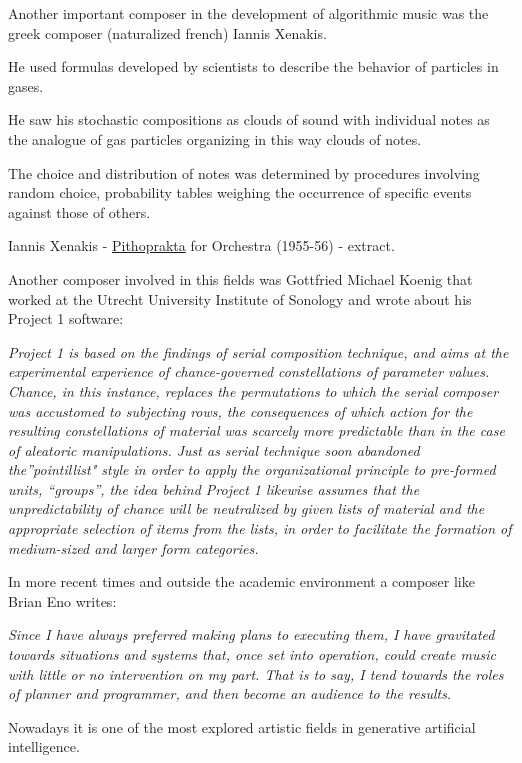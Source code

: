 Another important composer in the development of algorithmic music was the greek composer (naturalized french) Iannis Xenakis.

He used formulas developed by scientists to describe the behavior of particles in gases.

He saw his stochastic compositions as clouds of sound with individual notes as the analogue of gas particles organizing in this way clouds of notes.

The choice and distribution of notes was determined by procedures involving random choice, probability tables weighing the occurrence of specific events against those of others.


Iannis Xenakis - \href{http://www.musicaecodice.it/gitmedia/emc/5_media/xen1.mp4}{Pithoprakta} for Orchestra (1955-56) - extract.

Another composer involved in this fields was Gottfried Michael Koenig that worked at the Utrecht University Institute of Sonology and wrote about his Project 1 software:

\textit{Project 1 is based on the findings of serial composition technique, and aims at the experimental experience of chance-governed constellations of parameter values. Chance, in this instance, replaces the permutations to which the serial composer was accustomed to
subjecting rows, the consequences of which action for the resulting constellations of material was scarcely more predictable than in the case of aleatoric manipulations. Just as serial technique soon abandoned the''pointillist" style in order to apply the organizational principle to pre-formed units, ``groups'', the idea behind Project 1 likewise assumes that the unpredictability of chance will be neutralized by given
lists of material and the appropriate selection of items from the lists, in order to facilitate the formation of medium-sized and larger form categories.}

In more recent times and outside the academic environment a composer like Brian Eno writes:

\textit{Since I have always preferred making plans to executing them, I have
gravitated towards situations and systems that, once set into operation,
could create music with little or no intervention on my part. That is to
say, I tend towards the roles of planner and programmer, and then become
an audience to the results.}

Nowadays it is one of the most explored artistic fields in generative artificial intelligence.

